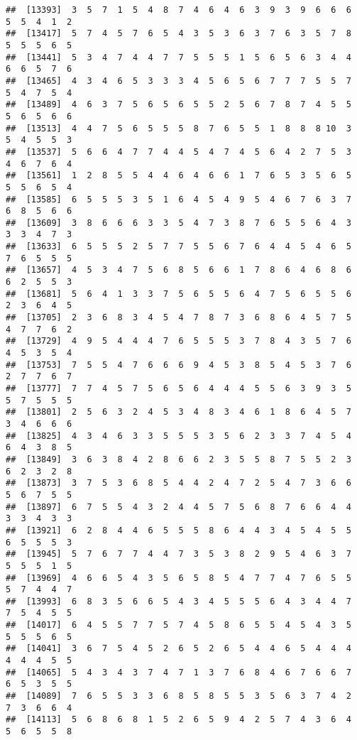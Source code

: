 \documentclass[
]{book}
\begin{document}
\begin{verbatim}
##  [13393]  3  5  7  1  5  4  8  7  4  6  4  6  3  9  3  9  6  6  6  5  5  4  1  2
##  [13417]  5  7  4  5  7  6  5  4  3  5  3  6  3  7  6  3  5  7  8  5  5  5  6  5
##  [13441]  5  3  4  7  4  4  7  7  5  5  5  1  5  6  5  6  3  4  4  6  6  5  7  6
##  [13465]  4  3  4  6  5  3  3  3  4  5  6  5  6  7  7  7  5  5  7  5  4  7  5  4
##  [13489]  4  6  3  7  5  6  5  6  5  5  2  5  6  7  8  7  4  5  5  5  6  5  6  6
##  [13513]  4  4  7  5  6  5  5  5  8  7  6  5  5  1  8  8  8 10  3  5  4  5  5  3
##  [13537]  5  6  6  4  7  7  4  4  5  4  7  4  5  6  4  2  7  5  3  4  6  7  6  4
##  [13561]  1  2  8  5  5  4  4  6  4  6  6  1  7  6  5  3  5  6  5  5  5  6  5  4
##  [13585]  6  5  5  5  3  5  1  6  4  5  4  9  5  4  6  7  6  3  7  6  8  5  6  6
##  [13609]  3  8  6  6  6  3  3  5  4  7  3  8  7  6  5  5  6  4  3  3  3  4  7  3
##  [13633]  6  5  5  5  2  5  7  7  5  5  6  7  6  4  4  5  4  6  5  7  6  5  5  5
##  [13657]  4  5  3  4  7  5  6  8  5  6  6  1  7  8  6  4  6  8  6  6  2  5  5  3
##  [13681]  5  6  4  1  3  3  7  5  6  5  5  6  4  7  5  6  5  5  6  2  3  6  4  5
##  [13705]  2  3  6  8  3  4  5  4  7  8  7  3  6  8  6  4  5  7  5  4  7  7  6  2
##  [13729]  4  9  5  4  4  4  7  6  5  5  5  3  7  8  4  3  5  7  6  4  5  3  5  4
##  [13753]  7  5  5  4  7  6  6  6  9  4  5  3  8  5  4  5  3  7  6  2  7  7  6  7
##  [13777]  7  7  4  5  7  5  6  5  6  4  4  4  5  5  6  3  9  3  5  5  7  5  5  5
##  [13801]  2  5  6  3  2  4  5  3  4  8  3  4  6  1  8  6  4  5  7  3  4  6  6  6
##  [13825]  4  3  4  6  3  3  5  5  5  3  5  6  2  3  3  7  4  5  4  6  4  3  8  5
##  [13849]  3  6  3  8  4  2  8  6  6  2  3  5  5  8  7  5  5  2  3  6  2  3  2  8
##  [13873]  3  7  5  3  6  8  5  4  4  2  4  7  2  5  4  7  3  6  6  5  6  7  5  5
##  [13897]  6  7  5  5  4  3  2  4  4  5  7  5  6  8  7  6  6  4  4  3  3  4  3  3
##  [13921]  6  2  8  4  4  6  5  5  5  8  6  4  4  3  4  5  4  5  5  6  5  5  5  3
##  [13945]  5  7  6  7  7  4  4  7  3  5  3  8  2  9  5  4  6  3  7  5  5  5  1  5
##  [13969]  4  6  6  5  4  3  5  6  5  8  5  4  7  7  4  7  6  5  5  5  7  4  4  7
##  [13993]  6  8  3  5  6  6  5  4  3  4  5  5  5  6  4  3  4  4  7  7  5  4  5  5
##  [14017]  6  4  5  5  7  7  5  7  4  5  8  6  5  5  4  5  4  3  5  5  5  5  6  5
##  [14041]  3  6  7  5  4  5  2  6  5  2  6  5  4  4  6  5  4  4  4  4  4  4  5  5
##  [14065]  5  4  3  4  3  7  4  7  1  3  7  6  8  4  6  7  6  6  7  6  5  3  5  5
##  [14089]  7  6  5  5  3  3  6  8  5  8  5  5  3  5  6  3  7  4  2  7  3  6  6  4
##  [14113]  5  6  8  6  8  1  5  2  6  5  9  4  2  5  7  4  3  6  4  5  6  5  5  8

\end{verbatim}
\end{document}
